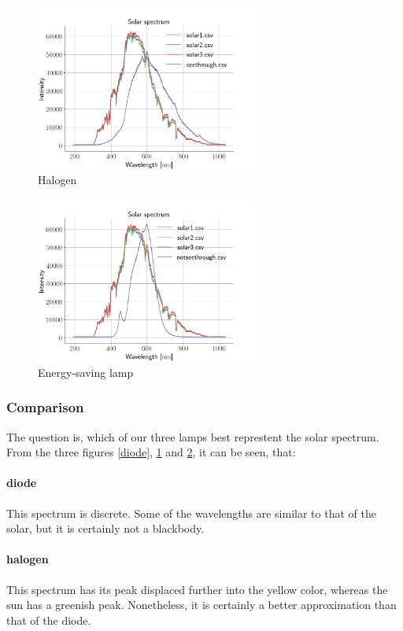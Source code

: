 \begin{figure}[h!]
\centering
\includegraphics[width=0.65\textwidth]{SolarComparison1}
\caption{Halogen}
\label{halogen}
\end{figure}

\begin{figure}[h!]
\centering
\includegraphics[width=0.65\textwidth]{SolarComparison2}
\caption{Energy-saving lamp}
\label{Energy-saving}
\end{figure}

\subsubsection{Comparison}
The question is, which of our three lamps best represtent the solar spectrum.
From the three figures \cref{diode}, \cref{halogen} and \cref{Energy-saving},
it can be seen, that:

\paragraph{diode}
This spectrum is discrete. Some of the wavelengths are similar to that of the
solar, but it is certainly not a blackbody.

\paragraph{halogen}
This spectrum has its peak displaced further into the yellow color, whereas the
sun has a greenish peak. Nonetheless, it is certainly a better approximation
than that of the diode.

